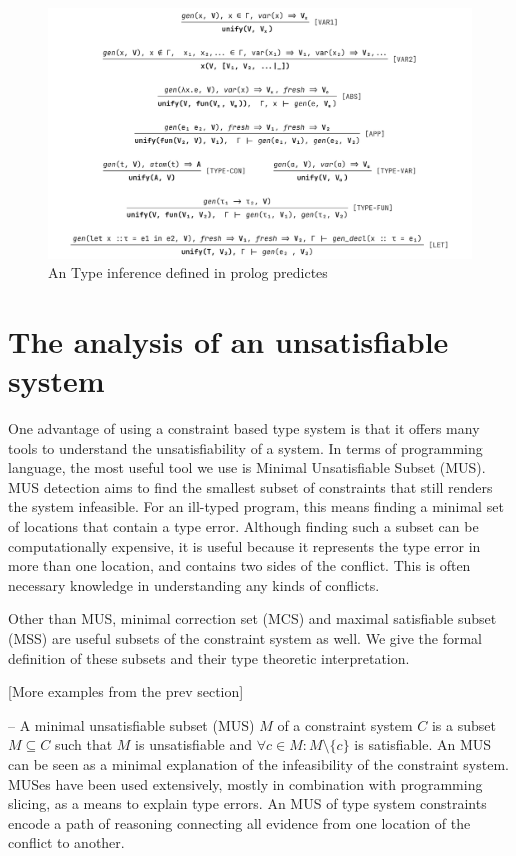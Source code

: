 \begin{figure}[hbt]
  \includegraphics[width=\linewidth]{Prolog}
  \caption{An Type inference defined in prolog predictes}
\end{figure}
  
\section{The analysis of an unsatisfiable system}

One advantage of using a constraint based type system is that it offers many tools to understand the unsatisfiability of a system. In terms of programming language, the most useful tool we use is Minimal Unsatisfiable Subset (MUS).  MUS detection aims to find the smallest subset of constraints that still renders the system infeasible. For an ill-typed program, this means finding a minimal set of locations that contain a type error. Although finding such a subset can be computationally expensive, it is useful because it represents the type error in more than one location, and contains two sides of the conflict. This is often necessary knowledge in understanding any kinds of conflicts.


Other than MUS, minimal correction set (MCS) and  maximal satisfiable subset (MSS) are useful subsets of the constraint system as well. We give the formal definition of these subsets and their type theoretic interpretation.


[More examples from the prev section]


– A minimal unsatisfiable subset (MUS) $M$ of a constraint system $C$ is a subset $M \subseteq C$ such that $M$ is unsatisfiable and $ \forall{c} \in M : M \setminus \{c\}$ is satisfiable. An MUS can be seen as a minimal explanation of the infeasibility of the constraint system. MUSes have been used extensively, mostly in combination with programming slicing, as a means to explain type errors. An MUS of type system constraints encode a path of reasoning connecting all evidence from one location of the conflict to another.


